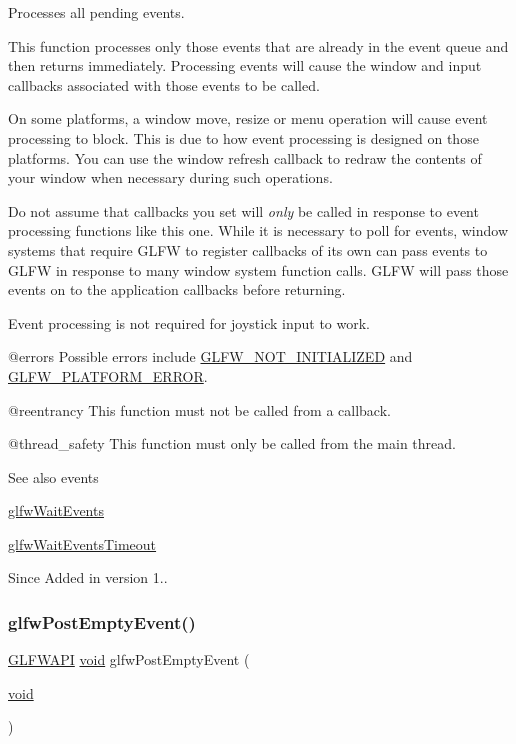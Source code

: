 Processes all pending events. 

This function processes only those events that are already in the event queue and then returns immediately. Processing events will cause the window and input callbacks associated with those events to be called.

On some platforms, a window move, resize or menu operation will cause event processing to block. This is due to how event processing is designed on those platforms. You can use the window refresh callback to redraw the contents of your window when necessary during such operations.

Do not assume that callbacks you set will {\itshape only} be called in response to event processing functions like this one. While it is necessary to poll for events, window systems that require G\+L\+FW to register callbacks of its own can pass events to G\+L\+FW in response to many window system function calls. G\+L\+FW will pass those events on to the application callbacks before returning.

Event processing is not required for joystick input to work.

@errors Possible errors include \mbox{\hyperlink{group__errors_ga2374ee02c177f12e1fa76ff3ed15e14a}{G\+L\+F\+W\+\_\+\+N\+O\+T\+\_\+\+I\+N\+I\+T\+I\+A\+L\+I\+Z\+ED}} and \mbox{\hyperlink{group__errors_gad44162d78100ea5e87cdd38426b8c7a1}{G\+L\+F\+W\+\_\+\+P\+L\+A\+T\+F\+O\+R\+M\+\_\+\+E\+R\+R\+OR}}.

@reentrancy This function must not be called from a callback.

@thread\+\_\+safety This function must only be called from the main thread.

\begin{DoxySeeAlso}{See also}
events 

\mbox{\hyperlink{group__window_ga6e042d05823c11e11c7339b81a237738}{glfw\+Wait\+Events}} 

\mbox{\hyperlink{group__window_ga05223a0a4c5e50f10f289e60398153aa}{glfw\+Wait\+Events\+Timeout}}
\end{DoxySeeAlso}
\begin{DoxySince}{Since}
Added in version 1.. 
\end{DoxySince}
\mbox{\label{group__window_gad6f6b997278c91c43b35970eb9713d7e}} 
\subsubsection{\texorpdfstring{glfwPostEmptyEvent()}{glfwPostEmptyEvent()}}
{\footnotesize\ttfamily \mbox{\hyperlink{glfw3_8h_a56da5036b2cc259351ae22fd6439bb47}{G\+L\+F\+W\+A\+PI}} \mbox{\hyperlink{glad_8h_a950fc91edb4504f62f1c577bf4727c29}{void}} glfw\+Post\+Empty\+Event (\begin{DoxyParamCaption}\item[{\mbox{\hyperlink{glad_8h_a950fc91edb4504f62f1c577bf4727c29}{void}}}]{ }\end{DoxyParamCaption})}



